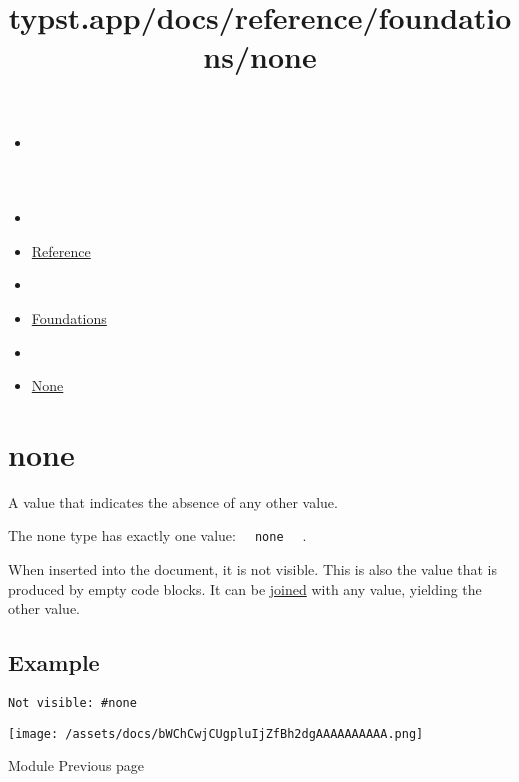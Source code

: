 \title{typst.app/docs/reference/foundations/none}

\begin{itemize}
\tightlist
\item
  \href{/docs}{}
\item
  
\item
  \href{/docs/reference/}{Reference}
\item
  
\item
  \href{/docs/reference/foundations/}{Foundations}
\item
  
\item
  \href{/docs/reference/foundations/none/}{None}
\end{itemize}

\section{\texorpdfstring{{ none }}{ none }}\label{summary}

A value that indicates the absence of any other value.

The none type has exactly one value:
\texttt{\ }{\texttt{\ none\ }}\texttt{\ } .

When inserted into the document, it is not visible. This is also the
value that is produced by empty code blocks. It can be
\href{/docs/reference/scripting/\#blocks}{joined} with any value,
yielding the other value.

\subsection{Example}\label{example}

\begin{verbatim}
Not visible: #none
\end{verbatim}

\texttt{[image: /assets/docs/bWChCwjCUgpluIjZfBh2dgAAAAAAAAAA.png]}

\href{/docs/reference/foundations/module/}{\pandocbounded{}}

{ Module } { Previous page }

\href{/docs/reference/foundations/panic/}{\pandocbounded{}}

